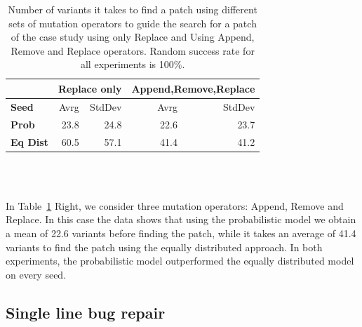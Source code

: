 \documentclass[conference]{IEEEtran}
\begin{document}
\begin{table}[ht]
\begin{tabular}{l|rr|rr}
  & \multicolumn{2}{|c|}{Replace only} & \multicolumn{2}{c}{Append,Remove,Replace} \\
\hline
\textbf{Seed}& Avrg & StdDev & Avrg & StdDev\\
\hline
\textbf{Prob} & 23.8 & 24.8  & 22.6 & 23.7  \\

\textbf{Eq Dist} & 60.5 & 57.1 & 41.4 & 41.2 \\
\hline
\end{tabular}
\\
\\
\center
  \caption{Number of variants it takes to find a patch using different sets of
    mutation operators to guide the search for a patch of the case study using
    only Replace and Using Append, Remove and Replace operators. Random success
    rate for all experiments is 100\%. }
  \label{fig:resultsReplace}
\end{table} 


In Table~\ref{fig:resultsReplace} Right, we consider three mutation operators: Append, 
Remove and Replace. In this case the data 
shows that using the probabilistic model we obtain a mean of 22.6 variants 
before finding the patch, while it takes an average of 41.4 variants to find the 
patch using the equally distributed approach. In both experiments, the
probabilistic model outperformed the equally distributed model on every seed.

\subsection{Single line bug repair}
\label{sec:single}
\end{document}
